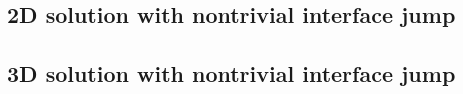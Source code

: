 \subsection{2D solution with nontrivial interface jump} \label{ss:jump2D} 


\subsection{3D solution with nontrivial interface jump} \label{ss:jump3D} 







